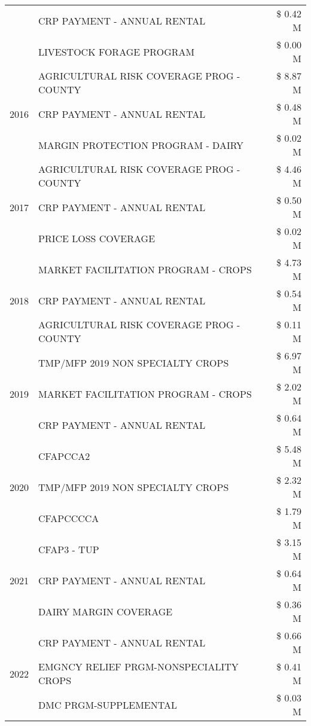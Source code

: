 \begin{tabular}{llr}
 & CRP PAYMENT - ANNUAL RENTAL & \$ 0.42 M \\
 & LIVESTOCK FORAGE PROGRAM & \$ 0.00 M \\
\cline{1-3}
\multirow[t]{3}{*}{2016} & AGRICULTURAL RISK COVERAGE PROG - COUNTY & \$ 8.87 M \\
 & CRP PAYMENT - ANNUAL RENTAL & \$ 0.48 M \\
 & MARGIN PROTECTION PROGRAM - DAIRY & \$ 0.02 M \\
\cline{1-3}
\multirow[t]{3}{*}{2017} & AGRICULTURAL RISK COVERAGE PROG - COUNTY & \$ 4.46 M \\
 & CRP PAYMENT - ANNUAL RENTAL & \$ 0.50 M \\
 & PRICE LOSS COVERAGE & \$ 0.02 M \\
\cline{1-3}
\multirow[t]{3}{*}{2018} & MARKET FACILITATION PROGRAM - CROPS & \$ 4.73 M \\
 & CRP PAYMENT - ANNUAL RENTAL & \$ 0.54 M \\
 & AGRICULTURAL RISK COVERAGE PROG - COUNTY & \$ 0.11 M \\
\cline{1-3}
\multirow[t]{3}{*}{2019} & TMP/MFP 2019 NON SPECIALTY CROPS & \$ 6.97 M \\
 & MARKET FACILITATION PROGRAM - CROPS & \$ 2.02 M \\
 & CRP PAYMENT - ANNUAL RENTAL & \$ 0.64 M \\
\cline{1-3}
\multirow[t]{3}{*}{2020} & CFAPCCA2 & \$ 5.48 M \\
 & TMP/MFP 2019 NON SPECIALTY CROPS & \$ 2.32 M \\
 & CFAPCCCCA & \$ 1.79 M \\
\cline{1-3}
\multirow[t]{3}{*}{2021} & CFAP3 - TUP & \$ 3.15 M \\
 & CRP PAYMENT - ANNUAL RENTAL & \$ 0.64 M \\
 & DAIRY MARGIN COVERAGE & \$ 0.36 M \\
\cline{1-3}
\multirow[t]{3}{*}{2022} & CRP PAYMENT - ANNUAL RENTAL & \$ 0.66 M \\
 & EMGNCY RELIEF PRGM-NONSPECIALITY CROPS & \$ 0.41 M \\
 & DMC PRGM-SUPPLEMENTAL & \$ 0.03 M \\
\cline{1-3}
\bottomrule
\end{tabular}
